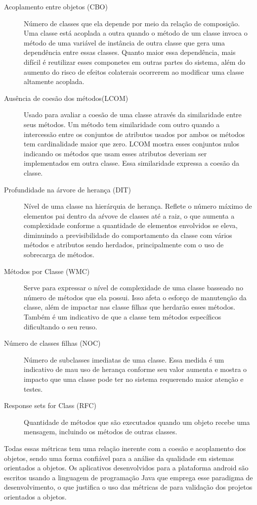 \begin{description}
\item[Acoplamento entre objetos (CBO)] Número de classes que ela depende por
meio da relação de composição. Uma classe está acoplada a outra quando o método
de um classe invoca o método de uma variável de instância de outra classe que
gera uma dependência entre essas classes. Quanto maior essa dependência, mais
difícil é reutilizar esses componetes em outras partes do sistema, além do
aumento do risco de efeitos colaterais ocorrerem ao modificar uma classe
altamente acoplada.
\item[Ausência de coesão dos métodos(LCOM)] Usado para avaliar a coesão de uma
classe através da similaridade entre seus métodos. Um método tem similaridade
com outro quando a intercessão entre os conjuntos de atributos usados por ambos
os métodos tem cardinalidade maior que zero. LCOM mostra esses conjuntos nulos
indicando os métodos que usam esses atributos deveriam ser implementados em
outra classe. Essa similaridade expressa a coesão da classe.
\item[Profundidade na árvore de herança (DIT)] Nível de uma classe na
hierárquia de herança. Reflete o número máximo de elementos pai dentro da aŕvove
de classes até a raiz, o que aumenta a complexidade conforme a quantidade de
elementos envolvidos se eleva, diminuindo a previsibilidade do comportamento da
classe com vários métodos e atributos sendo herdados, principalmente com o uso
de sobrecarga de métodos.
\item[Métodos por Classe (WMC)] Serve para expressar o nível de complexidade de
uma classe basseado no número de métodos que ela possui. Isso afeta o esforço de
manutenção da classe, além de impactar nas classe filhas que herdarão esses
métodos. Também é um indicativo de que a classe tem métodos específicos
dificultando o seu reuso.
\item[Número de classes filhas (NOC)] Número de subclasses imediatas de uma
classe. Essa medida é um indicativo de mau uso de herança conforme seu valor
aumenta e mostra o impacto que uma classe pode ter no sistema requerendo maior
atenção e testes.
\item[Response sets for Class (RFC)] Quantidade de métodos que são executados
quando um objeto recebe uma mensagem, incluindo os métodos de outras classes. 
\end{description}

Todas essas métricas tem uma relação inerente com a coesão e acoplamento dos
objetos, sendo uma forma confiável para a análise da qualidade em sistemas
orientados a objetos. Os aplicativos desenvolvidos para a plataforma android são
escritos usando a linguagem de programação Java que emprega esse paradigma de
desenvolvimento, o que justifica o uso das métricas de  para
validação dos projetos orientados a objetos.

